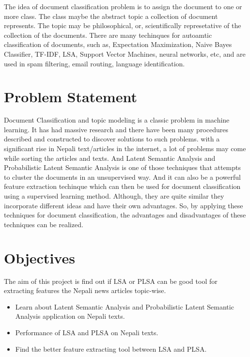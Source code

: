 \documentclass[12pt]{report}
\begin{document}
        The idea of document classification problem is to assign the document to one or more class. The class maybe the abstract topic a collection of document represents. The topic may be philosophical, or, scientifically represetative
        of the collection of the documents. There are many techinques for autoamtic classification of documents, such as, Expectation Maximization, Naive Bayes Classifier, TF-IDF, LSA, Support Vector Machines,
        neural networks, etc, and are used in spam filtering, email routing, language identification\cite{wikipedia2021}.











    \section{Problem Statement}
        Document Classification and topic modeling is a classic problem in machine learning. It has had massive research and there have been many procedures described and
        constructed to discover solutions to such problems. with a significant rise in Nepali text/articles in the internet, a lot of problems may come
        while sorting the articles and texts. And Latent Semantic Analysis and Probabilistic Latent Semantic Analysis is one of those techniques that attempts
        to cluster the documents in an unsupervised way. And it can also be a powerful feature extraction techinque which can then be used for document classification using a
        supervised learning method. Although, they are quite similar they incorporate different ideas and have their own advantages. So, by applying these techniques for document classification,
        the advantages and disadvantages of these techniques can be realized.

    \section{Objectives}
        The aim of this project is find out if LSA or PLSA can be good tool for extracting features the Nepali news articles topic-wise.
        \begin{itemize}
            \item Learn about Latent Semantic Analysis and Probabilistic Latent Semantic Analysis application on Nepali texts.
            \item Performance of LSA and PLSA on Nepali texts.
            \item Find the better feature extracting tool between LSA and PLSA.
        \end{itemize}
\end{document}
